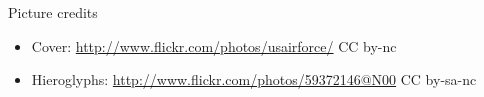 \begin{frame}[plain]{Picture credits}
  \scriptsize
  \begin{itemize}
    \item Cover: \url{http://www.flickr.com/photos/usairforce/} CC by-nc
    \item Hieroglyphs: \url{http://www.flickr.com/photos/59372146@N00} CC by-sa-nc
  \end{itemize}
\end{frame}


